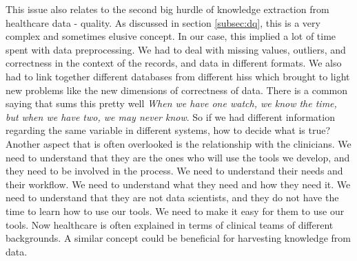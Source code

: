This issue also relates to the second big hurdle of knowledge extraction from healthcare data - quality. As discussed in section \ref{subsec:dq}, this is a very complex and sometimes elusive concept. In our case, this implied a lot of time spent with data preprocessing. We had to deal with missing values, outliers, and correctness in the context of the records, and data in different formats. We also had to link together different databases from different \acp{his} which brought to light new problems like the new dimensions of correctness of data. There is a common saying that sums this pretty well \textit{When we have one watch, we know the time, but when we have two, we may never know}. So if we had different information regarding the same variable in different systems, how to decide what is true?
Another aspect that is often overlooked is the relationship with the clinicians. We need to understand that they are the ones who will use the tools we develop, and they need to be involved in the process. We need to understand their needs and their workflow. We need to understand what they need and how they need it. We need to understand that they are not data scientists, and they do not have the time to learn how to use our tools. We need to make it easy for them to use our tools. Now healthcare is often explained in terms of clinical teams of different backgrounds. A similar concept could be beneficial for harvesting knowledge from data.
